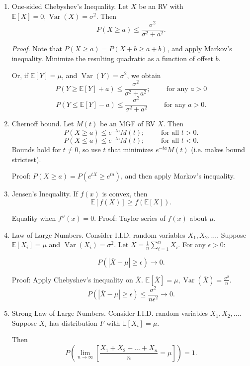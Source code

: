 \documentclass{article}
\newcommand{\EE}{\mathbb{E}}
\DeclareMathOperator{\Var}{Var}
\begin{document}
\begin{enumerate}
  \item One-sided Chebyshev's Inequality.  Let $X$ be an RV with $\EE[X] = 0, \Var(X) = \sigma^2$.  Then
    \[
      P(X \geq a) \leq \frac{\sigma^2}{\sigma^2 + a^2}.
    \]

    {\it Proof.} Note that $P(X\geq a) = P(X + b \geq a+b)$, and apply Markov's inequality.  Minimize the resulting quadratic as a function of offset $b$.

    Or, if $\EE[Y] = \mu$, and $\Var(Y) = \sigma^2$, we obtain
    \[
      P(Y \geq \EE[Y] + a) \leq \frac{\sigma^2}{\sigma^2 + a^2}; \qquad \text{ for any } a > 0
    \]
    \[
      P(Y \leq \EE[Y] - a) \leq \frac{\sigma^2}{\sigma^2 + a^2} \qquad \text{ for any } a > 0.
    \]

  \item Chernoff bound.  Let $M(t)$ be an MGF of RV $X$.  Then
    \[
      P(X \geq a) \leq e^{-ta} M(t); \qquad \text{ for all } t > 0.
    \]
    \[
      P(X \leq a) \leq e^{-ta} M(t); \qquad \text{ for all } t < 0.
    \]
    Bounds hold for $t \neq 0$, so use $t$ that minimizes $e^{-ta} M(t)$ (i.e. makes bound strictest).

    Proof: $P(X \geq a) = P(e^{tX} \geq e^{ta})$, and then apply Markov's inequality.

  \item Jensen's Inequality.  If $f(x)$ is convex, then
    \[
      \EE[f(X)] \geq f(\EE[X]).
    \]

    Equality when $f''(x) = 0$.  Proof: Taylor series of $f(x)$ about $\mu$.

  \item Law of Large Numbers.  Consider I.I.D. random variables $X_1, X_2, \dots $.  Suppose $\EE[X_i] = \mu$ and $\Var(X_i) = \sigma^2$.  Let $\overline{X} = \frac{1}{n} \sum_{i=1}^{n} X_i$.  For any $\epsilon > 0$:

    \[
      P(|\overline{X} - \mu| \geq \epsilon) \to 0. 
    \]


    Proof: Apply Chebyshev's inequality on $\overline{X}$. $\EE[\overline{X}] = \mu, \Var(\overline{X}) = \frac{\sigma^2}{n}$.
    \[
      P(|\overline{X} - \mu| \geq \epsilon) \leq \frac{\sigma^2}{n \epsilon^2} \to 0.
    \]
    
  \item Strong Law of Large Numbers.  Consider I.I.D. random variables $X_1, X_2, \dots$.  Suppose $X_i$ has distribution $F$ with $\EE[X_i] = \mu$.

    Then
    \[
      P\left(  \lim_{n \to \infty}\left[ \frac{X_1 + X_2 + \dots + X_n}{n} = \mu  \right] \right) = 1.
    \]


\end{enumerate}
\end{document}
